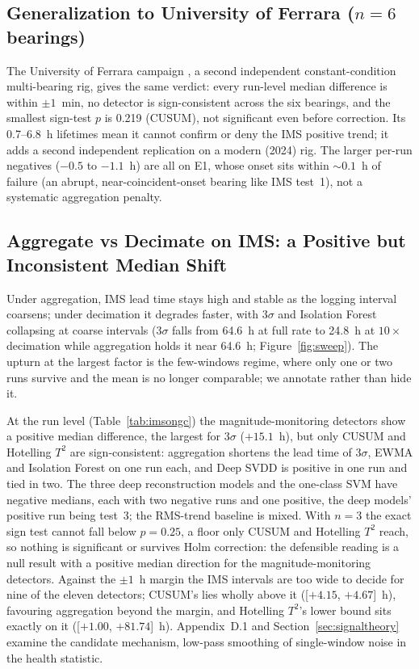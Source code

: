 \documentclass[IJPHM, 2026, 0]{PHMSociety}
\begin{document}
\subsection{Generalization to University of Ferrara ($n=6$ bearings)}
The University of Ferrara campaign \cite{arpa2024ferrara}, a second independent constant-condition multi-bearing rig, gives the same verdict: every run-level median difference is within $\pm1$~min, no detector is sign-consistent across the six bearings, and the smallest sign-test $p$ is 0.219 (CUSUM), not significant even before correction. Its 0.7--6.8~h lifetimes mean it cannot confirm or deny the IMS positive trend; it adds a second independent replication on a modern (2024) rig. The larger per-run negatives ($-0.5$ to $-1.1$~h) are all on E1, whose onset sits within ${\sim}0.1$~h of failure (an abrupt, near-coincident-onset bearing like IMS test~1), not a systematic aggregation penalty.

\subsection{Aggregate vs Decimate on IMS: a Positive but Inconsistent Median Shift}
Under aggregation, IMS lead time stays high and stable as the logging interval coarsens; under decimation it degrades faster, with $3\sigma$ and Isolation Forest collapsing at coarse intervals ($3\sigma$ falls from 64.6~h at full rate to 24.8~h at $10\times$ decimation while aggregation holds it near 64.6~h; Figure~\ref{fig:sweep}). The upturn at the largest factor is the few-windows regime, where only one or two runs survive and the mean is no longer comparable; we annotate rather than hide it.

At the run level (Table~\ref{tab:imsongc}) the magnitude-monitoring detectors show a positive median difference, the largest for $3\sigma$ ($+15.1$~h), but only CUSUM and Hotelling $T^2$ are sign-consistent: aggregation shortens the lead time of $3\sigma$, EWMA and Isolation Forest on one run each, and Deep SVDD is positive in one run and tied in two. The three deep reconstruction models and the one-class SVM have negative medians, each with two negative runs and one positive, the deep models' positive run being test~3; the RMS-trend baseline is mixed. With $n=3$ the exact sign test cannot fall below $p=0.25$, a floor only CUSUM and Hotelling $T^2$ reach, so nothing is significant or survives Holm correction: the defensible reading is a null result with a positive median direction for the magnitude-monitoring detectors. Against the $\pm 1$~h margin the IMS intervals are too wide to decide for nine of the eleven detectors; CUSUM's lies wholly above it ([$+4.15$, $+4.67$]~h), favouring aggregation beyond the margin, and Hotelling $T^2$'s lower bound sits exactly on it ([$+1.00$, $+81.74$]~h). Appendix~D.1 and Section~\ref{sec:signaltheory} examine the candidate mechanism, low-pass smoothing of single-window noise in the health statistic.
\end{document}
